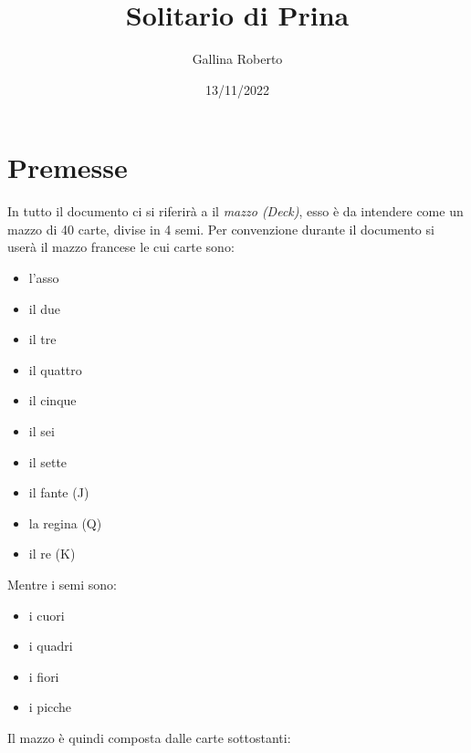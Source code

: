 \documentclass[a4paper]{article}
\begin{document}
\begin{titlepage}
    \title{Solitario di Prina}
    \author{Gallina Roberto}
    \date{13/11/2022}
    \maketitle
\end{titlepage}

\newpage

\tableofcontents

\newpage

\section{Premesse}
In tutto il documento ci si riferirà a il \emph{mazzo (Deck)}, esso è da intendere come un mazzo di 40 carte, divise in 4 semi. Per convenzione durante il documento si userà il mazzo francese le cui carte sono:

\begin{itemize}
    \item l'asso
    \item il due
    \item il tre
    \item il quattro
    \item il cinque
    \item il sei
    \item il sette
    \item il fante (J)
    \item la regina (Q)
    \item il re (K)
\end{itemize}

\noindent
Mentre i semi sono:

\begin{itemize}
    \item i cuori
    \item i quadri
    \item i fiori
    \item i picche
\end{itemize}


\noindent
Il mazzo è quindi composta dalle carte sottostanti:
\end{document}
